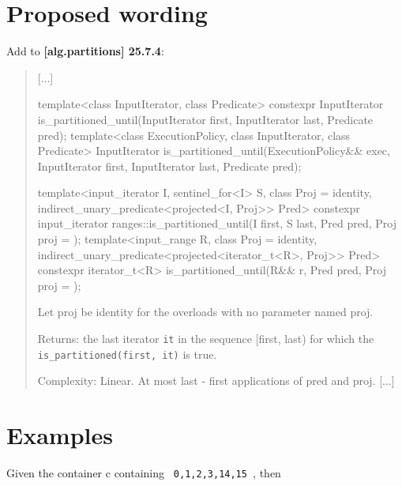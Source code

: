\documentclass{wg21}
\newcommand{\cc}[1]{\texttt{#1}}
\begin{document}
\section{Proposed wording}
Add to \textbf{[alg.partitions] 25.7.4}:
\begin{quote}
[...]	
\begin{itemdecl}
template<class InputIterator, class Predicate>
  constexpr InputIterator is_partitioned_until(InputIterator first, InputIterator last,
                                               Predicate pred);
template<class ExecutionPolicy, class InputIterator, class Predicate>
  InputIterator is_partitioned_until(ExecutionPolicy&& exec, InputIterator first,
                                     InputIterator last, Predicate pred);
\end{itemdecl}

\begin{itemdecl}
template<input_iterator I, sentinel_for<I> S, class Proj = identity,
         indirect_unary_predicate<projected<I, Proj>> Pred>
  constexpr input_iterator ranges::is_partitioned_until(I first, S last, Pred pred,
                                                        Proj proj = {});	
template<input_range R, class Proj = identity, 
         indirect_unary_predicate<projected<iterator_t<R>, Proj>> Pred>
  constexpr iterator_t<R> is_partitioned_until(R&& r, Pred pred, Proj proj = {});
\end{itemdecl}
    Let proj be identity{} for the overloads with no parameter named proj.
    
    Returns: the last iterator \cc{it} in the sequence [first, last) for which the \cc{is_partitioned(first, it)} is true.
    
    Complexity: Linear. At most last - first applications of pred and proj.
[...]
\end{quote}

\section{Examples}
Given the container c containing \cc{ 0,1,2,3,14,15 }, then
\begin{quote}
\end{quote}
\end{document}
